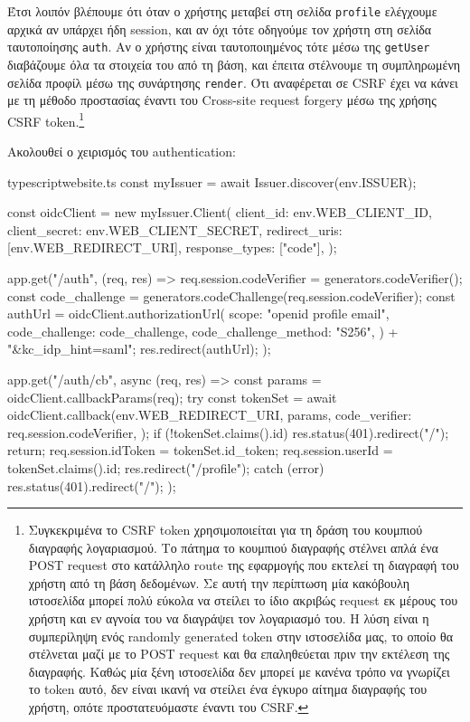 \documentclass[../thesis.tex]{subfiles}
\begin{document}
Έτσι λοιπόν βλέπουμε ότι όταν ο χρήστης μεταβεί στη σελίδα \texttt{profile} ελέγχουμε αρχικά αν υπάρχει ήδη session, και αν όχι τότε οδηγούμε τον χρήστη στη σελίδα ταυτοποίησης \texttt{auth}.
Αν ο χρήστης είναι ταυτοποιημένος τότε μέσω της \texttt{getUser} διαβάζουμε όλα τα στοιχεία του από τη βάση, και έπειτα στέλνουμε τη συμπληρωμένη σελίδα προφίλ μέσω της συνάρτησης \texttt{render}.
Ότι αναφέρεται σε CSRF έχει να κάνει με τη μέθοδο προστασίας έναντι του Cross-site request forgery μέσω της χρήσης CSRF token.\footnote{Συγκεκριμένα το CSRF token χρησιμοποιείται για τη δράση του κουμπιού διαγραφής λογαριασμού. Το πάτημα το κουμπιού διαγραφής στέλνει απλά ένα POST request στο κατάλληλο route της εφαρμογής που εκτελεί τη διαγραφή του χρήστη από τη βάση δεδομένων. Σε αυτή την περίπτωση μία κακόβουλη ιστοσελίδα μπορεί πολύ εύκολα να στείλει το ίδιο ακριβώς request εκ μέρους του χρήστη και εν αγνοία του να διαγράψει τον λογαριασμό του. Η λύση είναι η συμπερίληψη ενός randomly generated token στην ιστοσελίδα μας, το οποίο θα στέλνεται μαζί με το POST request και θα επαληθεύεται πριν την εκτέλεση της διαγραφής. Καθώς μία ξένη ιστοσελίδα δεν μπορεί με κανένα τρόπο να γνωρίζει το token αυτό, δεν είναι ικανή να στείλει ένα έγκυρο αίτημα διαγραφής του χρήστη, οπότε προστατευόμαστε έναντι του CSRF.}

Ακολουθεί ο χειρισμός του authentication:

\begin{codeblock}{typescript}{website.ts}
  const myIssuer = await Issuer.discover(env.ISSUER);

  const oidcClient = new myIssuer.Client({
    client_id: env.WEB_CLIENT_ID,
    client_secret: env.WEB_CLIENT_SECRET,
    redirect_uris: [env.WEB_REDIRECT_URI],
    response_types: ["code"],
  });

  app.get("/auth", (req, res) => {
    req.session.codeVerifier = generators.codeVerifier();
    const code_challenge = generators.codeChallenge(req.session.codeVerifier);
    const authUrl =
      oidcClient.authorizationUrl({
        scope: "openid profile email",
        code_challenge: code_challenge,
        code_challenge_method: "S256",
      }) + "&kc_idp_hint=saml";
    res.redirect(authUrl);
  });

  app.get("/auth/cb", async (req, res) => {
    const params = oidcClient.callbackParams(req);
    try {
      const tokenSet = await oidcClient.callback(env.WEB_REDIRECT_URI, params, {
        code_verifier: req.session.codeVerifier,
      });
      if (!tokenSet.claims().id) {
        res.status(401).redirect("/");
        return;
      }
      req.session.idToken = tokenSet.id_token;
      req.session.userId = tokenSet.claims().id;
      res.redirect("/profile");
    } catch (error) {
      res.status(401).redirect("/");
    }
  });
\end{codeblock}
\end{document}
